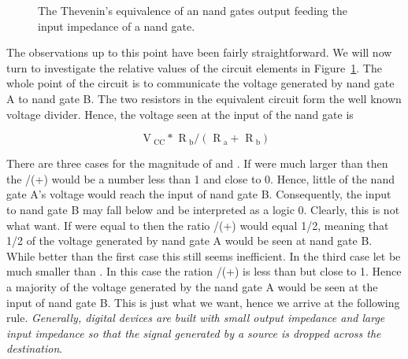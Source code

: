             \begin{figure}[ht]
                \caption{The Thevenin's equivalence of an nand gates output feeding the
                input impedance of a nand gate.}
                \label{fig:impedance}
            \end{figure}

            The observations up to this point have been fairly straightforward.
            We will now turn to investigate the relative values of the circuit
            elements in Figure~\ref{fig:impedance}.  The whole point of the
            circuit is to communicate the voltage generated by nand gate A to
            nand gate B.  The two resistors in the equivalent circuit form the
            well known voltage divider.  Hence, the voltage seen at the input
            of the nand gate is

            $$ \text{ V}_\text{ CC}  *
            \text{ R}_\text{ b}  /
            ( \text{ R}_\text{ a} + \text{ R}_\text{ b} ) $$

            There are three
            cases for the magnitude of \Ra and \Rb.  If \Ra were much larger
            than \Rb then the \Rb/(\Ra+\Rb) would be a number less than 1
            and close to 0.  Hence, little of the nand gate A's voltage
            would reach the input of nand gate B.  Consequently, the input
            to nand gate B may fall below \VIL and be interpreted as a logic
            0.  Clearly, this is not
            what want.  If \Ra were equal to \Rb then the ratio \Rb/(\Ra+\Rb)
            would equal 1/2, meaning that 1/2 of the voltage generated by nand
            gate A would be seen at nand gate B.  While better than the first
            case this still seems inefficient.  In the third case let
            \Ra be much smaller than \Rb.  In this case the ration \Rb/(\Ra+\Rb)
            is less than but close to 1.  Hence a majority of the voltage
            generated by the nand gate A would be seen at the input of nand gate
            B. This is just what we want, hence we arrive at the following
            rule. \textit{ Generally, digital devices are built with small output
                impedance and large input impedance so that the signal
            generated by a source is dropped across the destination}.

